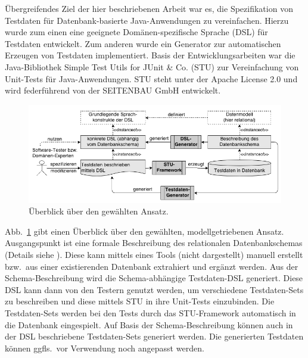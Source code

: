 Übergreifendes Ziel der hier beschriebenen Arbeit \cite{MT:Moll:2013} war es, die Spezifikation von Testdaten für Datenbank-basierte Java-Anwendungen zu vereinfachen.
%
Hierzu wurde zum einen  eine geeignete Domänen-spezifische Sprache (DSL) für Testdaten entwickelt.
%
%
Zum anderen wurde ein Generator zur automatischen Erzeugen von Testdaten implementiert. 
%
%
%
Basis der Entwicklungsarbeiten war die Java-Bibliothek Simple Test Utils for JUnit \& Co. (STU) zur Vereinfachung von Unit-Tests für Java-Anwendungen.
%
STU steht unter der Apache License 2.0 und wird federführend von der  SEITENBAU GmbH entwickelt. 
%


\begin{figure}[tb]
	\begin{center}
		\includegraphics[width=12.75cm]{images/ansatz.png}
		\caption{\label{ansatz}Überblick über den gewählten Ansatz.}
	\end{center}
\end{figure}

Abb.~\ref{ansatz} gibt einen Überblick über den gewählten, modellgetriebenen Ansatz.
%
Ausgangspunkt ist eine formale Beschreibung des relationalen Datenbankschemas (Details siehe \cite{MT:Moll:2013}).
%
Diese kann mittels eines Tools (nicht dargestellt) manuell erstellt bzw.~aus einer existierenden Datenbank extrahiert und ergänzt werden.
%
Aus der Schema-Beschreib\-ung wird die Schema-abhängige Testdaten-DSL generiert. 
%
Diese DSL kann dann von den Testern genutzt werden, um verschiedene Testdaten-Sets zu beschreiben und diese mittels STU in ihre Unit-Tests einzubinden.
%
Die Testdaten-Sets werden bei den Tests durch das STU-Framework automatisch in die Datenbank eingespielt.
%
%
Auf Basis der Schema-Be\-schrei\-bung können auch in der DSL beschriebene Test\-da\-ten-Sets  generiert werden. Die generierten Testdaten können ggfls.~vor Verwendung noch angepasst werden.
%
%
%





	




